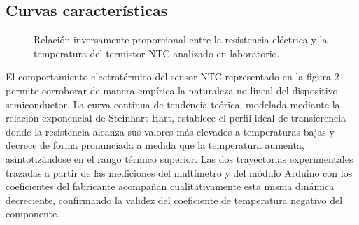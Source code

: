 \subsection{Curvas características}
\begin{figure}[htbp]
\centering
{}
\caption{Relación inversamente proporcional entre la resistencia eléctrica y la temperatura del termistor NTC analizado en laboratorio.}
\label{fig:curva_ntc}
\end{figure}

El comportamiento electrotérmico del sensor NTC representado en la figura 2 permite corroborar de manera empírica la naturaleza no lineal del dispositivo semiconductor. La curva continua de tendencia teórica, modelada mediante la relación exponencial de Steinhart-Hart, establece el perfil ideal de transferencia donde la resistencia alcanza sus valores más elevados a temperaturas bajas y decrece de forma pronunciada a medida que la temperatura aumenta, asintotizándose en el rango térmico superior. Las dos trayectorias experimentales trazadas a partir de las mediciones del multímetro y del módulo Arduino con los coeficientes del fabricante acompañan cualitativamente esta misma dinámica decreciente, confirmando la validez del coeficiente de temperatura negativo del componente.


